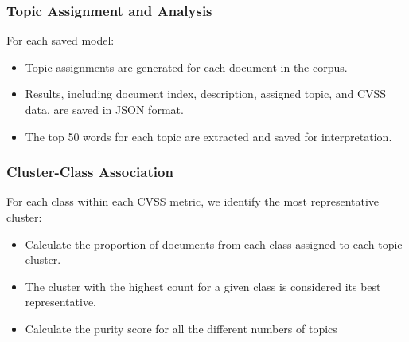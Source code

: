 \documentclass[12pt]{article}
\begin{document}
\subsubsection*{Topic Assignment and Analysis}

For each saved model:

\begin{itemize}

	\item Topic assignments are generated for each document in the corpus.

	\item Results, including document index, description, assigned topic, and CVSS data, are saved
	      in JSON format.

	\item The top 50 words for each topic are extracted and saved for interpretation.

\end{itemize}








\subsubsection*{Cluster-Class Association}

For each class within each CVSS metric, we identify the most representative cluster:

\begin{itemize}

	\item Calculate the proportion of documents from each class assigned to each topic cluster.

	\item The cluster with the highest count for a given class is considered its best representative.

	\item Calculate the purity score for all the different numbers of topics

\end{itemize}
\end{document}
